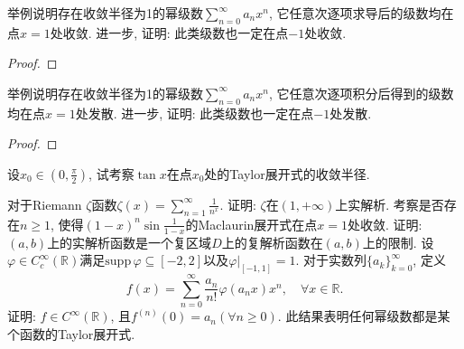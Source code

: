 \begin{quizb}
\woe 举例说明存在收敛半径为1的幂级数\(\sum_{n=0}^{\infty}a_nx^n\), 它任意次逐项求导后的级数均在点\(x=1\)处收敛. 进一步, 证明: 此类级数也一定在点\(-1\)处收敛.
\begin{proof}

\end{proof}
\woe 举例说明存在收敛半径为1的幂级数\(\sum_{n=0}^{\infty}a_nx^n\), 它任意次逐项积分后得到的级数均在点\(x=1\)处发散. 进一步, 证明: 此类级数也一定在点\(-1\)处发散.
\begin{proof}

\end{proof}
\woe 设\(x_0\in\left(0,\frac{\pi}{2}\right)\), 试考察\(\tan x\)在点\(x_0\)处的Taylor展开式的收敛半径.
\begin{solution}

\end{solution}
\woe 对于Riemann \(\zeta\)函数\(\zeta(x)=\sum_{n=1}^{\infty}\frac{1}{n^x}\). 证明: \(\zeta\)在\((1,+\infty)\)上实解析.
\woe 考察是否存在\(n\geqslant 1\), 使得\((1-x)^n\sin\frac{1}{1-x}\)的Maclaurin展开式在点\(x=1\)处收敛.
\woe 证明: \((a,b)\)上的实解析函数是一个复区域\(D\)上的复解析函数在\((a,b)\)上的限制.
\woe 设\(\varphi\in C_c^{\infty}(\mathbb{R})\)满足\(\mathrm{supp}\,\varphi\subseteq [-2,2]\)以及\(\varphi\big|_{[-1,1]}=1\). 对于实数列\(\{a_k\}_{k=0}^{\infty}\), 定义\[f(x)=\sum_{n=0}^{\infty}\frac{a_n}{n!}\varphi(a_nx)x^n,\quad\forall x\in\mathbb{R}.\]证明: \(f\in C^{\infty}(\mathbb{R})\), 且\(f^{(n)}(0)=a_n(\forall n\geqslant 0)\). 此结果表明任何幂级数都是某个函数的Taylor展开式.
\end{quizb}
